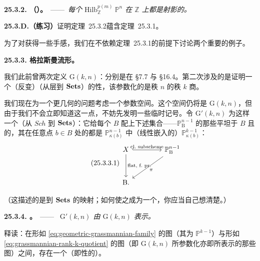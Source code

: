 \textbf{25.3.2. \trhTheorem（\trGrothendieck）。}\ ——\ \emph{每个 $\mathrm{Hilb}^{p(m)}_{\mathbb{Z}}\ \mathbb{P}^n$ 在 $\mathbb{Z}$ 上都是射影的。}

\textbf{25.3.D.（练习）}\quad 证明\mbox{定理~25.3.2}蕴含\mbox{定理~25.3.1}。

为了对\trHilbertScheme{}获得一些手感，我们在不依赖\mbox{定理~25.3.1}的前提下讨论两个重要的例子。

\textbf{25.3.3. 格拉斯曼流形。}

我们此前曾两次定义\trGrassmannian{} $\mathrm{G}(k,n)$：分别是在 \S7.7 与 \S16.4。第二次涉及的是证明一个（反变）\trFunctor{}（从层\trCategory{}到 $\mathbf{Sets}$）的\trRepresentable{}性，该\trFunctor{}参数化的是秩 $n$ \trFreeSheaf{}的秩 $k$ \trLocallyFreeSheaf{}商。

我们现在为一个更几何的问题考虑一个参数空间。这个空间仍将是 $\mathrm{G}(k,n)$，但由于我们不会立即知道这一点，不妨先发明一些临时记号。令 $\mathrm{G}'(k,n)$ 为这样一个\trContravariantFunctor（从 $\mathit{Sch}$ 到 $\mathbf{Sets}$）：它给每个\trScheme{} $B$ 配上下述集合——$\mathbb{P}^{n-1}_{\mathrm{B}}$ 的那些平坦于 $B$ 且\emph{\trFinitelyPresented}的\trClosedSubscheme，其在任意点 $b\in B$ 处的\trFiber{}都是 $\mathbb{P}^{n-1}_{\kappa(b)}$ 中（线性嵌入的）$\mathbb{P}^{k-1}_{\kappa(b)}$：
\begin{equation*}\tag{25.3.3.1}\label{eq:geometric-grassmannian-family}
\begin{tikzcd}[row sep=3em, column sep=4.2em]
X \ar[r, hook, "\text{cl.\ subscheme}"] \ar[d, "\text{flat, f.\ pr.}"] & \mathbb{P}^{n-1}_{\mathrm{B}} \ar[dl, "\pi"] \\
\mathrm{B}. &
\end{tikzcd}
\end{equation*}

（这描述的是到 $\mathbf{Sets}$ 的映射；\trPullback{}如何使之成为一个\trContravariantFunctor，你应当自己想清楚。）

\textbf{25.3.4. \trhTheorem。}\ ——\ \emph{\trFunctor{} $\mathrm{G}'(k,n)$ 由 $\mathrm{G}(k,n)$ 表示。}

释读：在形如 \eqref{eq:geometric-grassmannian-family} 的图（其\trFiber{}为 $\mathbb{P}^{k-1}$）与形如 \eqref{eq:grassmannian-rank-k-quotient} 的图（即 $\mathrm{G}(k,n)$ 所参数化亦即所表示的那些图）之间，存在一个\trNatural\trBijection（即\trFunctor{}性的\trBijection{}）。

